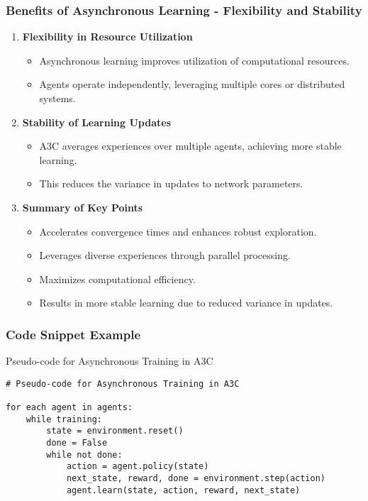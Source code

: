 \documentclass{beamer}
\begin{document}
\begin{frame}[fragile]
    \frametitle{Benefits of Asynchronous Learning - Flexibility and Stability}
    \begin{enumerate}[resume]
        \item \textbf{Flexibility in Resource Utilization}
        \begin{itemize}
            \item Asynchronous learning improves utilization of computational resources.
            \item Agents operate independently, leveraging multiple cores or distributed systems.
        \end{itemize}

        \item \textbf{Stability of Learning Updates}
        \begin{itemize}
            \item A3C averages experiences over multiple agents, achieving more stable learning.
            \item This reduces the variance in updates to network parameters.
        \end{itemize}

        \item \textbf{Summary of Key Points}
        \begin{itemize}
            \item Accelerates convergence times and enhances robust exploration.
            \item Leverages diverse experiences through parallel processing.
            \item Maximizes computational efficiency.
            \item Results in more stable learning due to reduced variance in updates.
        \end{itemize}
    \end{enumerate}
\end{frame}

\begin{frame}[fragile]
    \frametitle{Code Snippet Example}
    \begin{block}{Pseudo-code for Asynchronous Training in A3C}
        \begin{lstlisting}
# Pseudo-code for Asynchronous Training in A3C

for each agent in agents:
    while training:
        state = environment.reset()
        done = False
        while not done:
            action = agent.policy(state)
            next_state, reward, done = environment.step(action)
            agent.learn(state, action, reward, next_state)
        \end{lstlisting}
    \end{block}
\end{frame}
\end{document}
